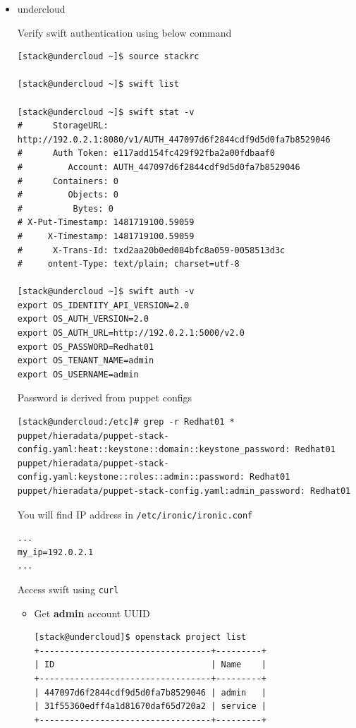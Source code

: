 \documentclass{article}
\begin{document}
\begin{itemize}
\item undercloud

Verify swift authentication using below command

\begin{verbatim}
[stack@undercloud ~]$ source stackrc

[stack@undercloud ~]$ swift list

[stack@undercloud ~]$ swift stat -v
#      StorageURL: http://192.0.2.1:8080/v1/AUTH_447097d6f2844cdf9d5d0fa7b8529046
#      Auth Token: e117add154fc429f92fba2a00fdbaaf0
#         Account: AUTH_447097d6f2844cdf9d5d0fa7b8529046
#      Containers: 0
#         Objects: 0
#      	   Bytes: 0
# X-Put-Timestamp: 1481719100.59059
#     X-Timestamp: 1481719100.59059
#      X-Trans-Id: txd2aa20b0ed084bfc8a059-0058513d3c
#     ontent-Type: text/plain; charset=utf-8

[stack@undercloud ~]$ swift auth -v
export OS_IDENTITY_API_VERSION=2.0
export OS_AUTH_VERSION=2.0
export OS_AUTH_URL=http://192.0.2.1:5000/v2.0
export OS_PASSWORD=Redhat01
export OS_TENANT_NAME=admin
export OS_USERNAME=admin
\end{verbatim}

Password is derived from puppet configs

\begin{verbatim}
[stack@undercloud:/etc]# grep -r Redhat01 *
puppet/hieradata/puppet-stack-config.yaml:heat::keystone::domain::keystone_password: Redhat01
puppet/hieradata/puppet-stack-config.yaml:keystone::roles::admin::password: Redhat01
puppet/hieradata/puppet-stack-config.yaml:admin_password: Redhat01
\end{verbatim}

You will find IP address in \texttt{/etc/ironic/ironic.conf}

\begin{verbatim}
...
my_ip=192.0.2.1
...
\end{verbatim}

Access swift using \texttt{curl}

\begin{itemize}
\item Get \textbf{admin} account UUID

\begin{verbatim}
[stack@undercloud]$ openstack project list
+----------------------------------+---------+
| ID                               | Name    |
+----------------------------------+---------+
| 447097d6f2844cdf9d5d0fa7b8529046 | admin   |
| 31f55360edff4a1d81670daf65d720a2 | service |
+----------------------------------+---------+
\end{verbatim}


\end{itemize}
\end{itemize}
\end{document}
